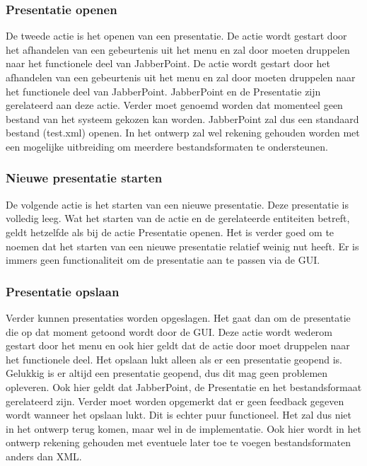 \documentclass[a4paper]{article}
\begin{document}
\subsubsection{Presentatie openen}
\label{subsub:presOpenen}
De tweede actie is het openen van een presentatie. De actie wordt gestart door het afhandelen van een gebeurtenis uit het menu en zal door moeten druppelen naar het functionele deel van JabberPoint. De actie wordt gestart door het afhandelen van een gebeurtenis uit het menu en zal door moeten druppelen naar het functionele deel van JabberPoint. JabberPoint en de Presentatie zijn gerelateerd aan deze actie. Verder moet genoemd worden dat momenteel geen bestand van het systeem gekozen kan worden. JabberPoint zal dus een standaard bestand (test.xml) openen. In het ontwerp zal wel rekening gehouden worden met een mogelijke uitbreiding om meerdere bestandsformaten te ondersteunen.

\subsubsection{Nieuwe presentatie starten}
De volgende actie is het starten van een nieuwe presentatie. Deze presentatie is volledig leeg. Wat het starten van de actie en de gerelateerde entiteiten betreft, geldt hetzelfde als bij de actie Presentatie openen. Het is verder goed om te noemen dat het starten van een nieuwe presentatie relatief weinig nut heeft. Er is immers geen functionaliteit om de presentatie aan te passen via de GUI.

\subsubsection{Presentatie opslaan}
Verder kunnen presentaties worden opgeslagen. Het gaat dan om de presentatie die op dat moment getoond wordt door de GUI. Deze actie wordt wederom gestart door het menu en ook hier geldt dat de actie door moet druppelen naar het functionele deel. Het opslaan lukt alleen als er een presentatie geopend is. Gelukkig is er altijd een presentatie geopend, dus dit mag geen problemen opleveren. Ook hier geldt dat JabberPoint, de Presentatie en het bestandsformaat gerelateerd zijn. Verder moet worden opgemerkt dat er geen feedback gegeven wordt wanneer het opslaan lukt. Dit is echter puur functioneel. Het zal dus niet in het ontwerp terug komen, maar wel in de implementatie. Ook hier wordt in het ontwerp rekening gehouden met eventuele later toe te voegen bestandsformaten anders dan XML.
\end{document}
